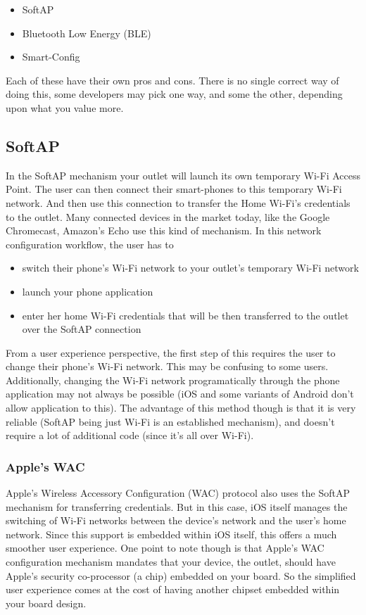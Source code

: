 \documentclass[main.tex]{subfiles}
\begin{document}
\begin{itemize}
    \item SoftAP 
    \item Bluetooth Low Energy (BLE)
    \item Smart-Config
\end{itemize}

Each of these have their own pros and cons. There is no single correct way of doing this, some developers may pick one way, and some the other, depending upon what you value more.

\subsection{SoftAP}
In the SoftAP mechanism your outlet will launch its own temporary Wi-Fi Access Point. The user can then connect their smart-phones to this temporary Wi-Fi network. And then use this connection to transfer the Home Wi-Fi's credentials to the outlet. Many connected devices in the market today, like the Google Chromecast, Amazon's Echo use this kind of mechanism. In this network configuration workflow, the user has to 
\begin{itemize}
    \item switch their phone's Wi-Fi network to your outlet's temporary Wi-Fi network
    \item launch your phone application
    \item enter her home Wi-Fi credentials that will be then transferred to the outlet over the SoftAP connection
\end{itemize}
From a user experience perspective, the first step of this requires the user to change their phone's Wi-Fi network. This may be confusing to some users. Additionally, changing the Wi-Fi network programatically through the phone application may not always be possible (iOS and some variants of Android don't allow application to this). The advantage of this method though is that it is very reliable (SoftAP being just Wi-Fi is an established mechanism), and doesn't require a lot of additional code (since it's all over Wi-Fi).

\subsubsection{Apple's WAC}
Apple's Wireless Accessory Configuration (WAC) protocol also uses the SoftAP mechanism for transferring credentials. But in this case, iOS itself manages the switching of Wi-Fi networks between the device's network and the user's home network. Since this support is embedded within iOS itself, this offers a much smoother user experience.
One point to note though is that Apple's WAC configuration mechanism mandates that your device, the outlet, should have Apple's security co-processor (a chip) embedded on your board. So the simplified user experience comes at the cost of having another chipset embedded within your board design.
\end{document}
